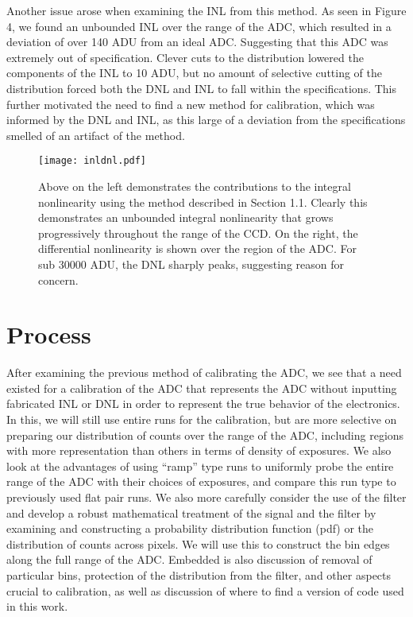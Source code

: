 \documentclass[11pt, letterpaper]{article}
\begin{document}
Another issue arose when examining the INL from this method. 
As seen in Figure 4, we found an unbounded INL over the range of the ADC, which resulted in a deviation of over 140 ADU from an ideal ADC. 
Suggesting that this ADC was extremely out of specification. 
Clever cuts to the distribution lowered the components of the INL to 10 ADU, but no amount of selective cutting of the distribution forced both the DNL and INL to fall within the specifications. 
This further motivated the need to find a new method for calibration, which was informed by the DNL and INL, as this large of a deviation from the specifications smelled of an artifact of the method. 

\begin{figure}
	\texttt{[image: inldnl.pdf]}
	\caption{Above on the left demonstrates the contributions to the integral nonlinearity using the method described in Section 1.1. Clearly this demonstrates an unbounded integral nonlinearity that grows progressively throughout the range of the CCD. On the right, the differential nonlinearity is shown over the region of the ADC. For sub 30000 ADU, the DNL sharply peaks, suggesting reason for concern.}
\end{figure}

\section{Process}
\indent


After examining the previous method of calibrating the ADC, we see that a need existed for a calibration of the ADC that represents the ADC without inputting fabricated INL or DNL in order to represent the true behavior of the electronics. 
In this, we will still use entire runs for the calibration, but are more selective on preparing our distribution of counts over the range of the ADC, including regions with more representation than others in terms of density of exposures. 
We also look at the advantages of using “ramp” type runs to uniformly probe the entire range of the ADC with their choices of exposures, and compare this run type to previously used flat pair runs.
We also more carefully consider the use of the filter and develop a robust mathematical treatment of the signal and the filter by examining and constructing a probability distribution function (pdf) or the distribution of counts across pixels.  
We will use this to construct the bin edges along the full range of the ADC. 
Embedded is also discussion of removal of particular bins, protection of the distribution from the filter, and other aspects crucial to calibration, as well as discussion of where to find a version of code used in this work.
\end{document}
